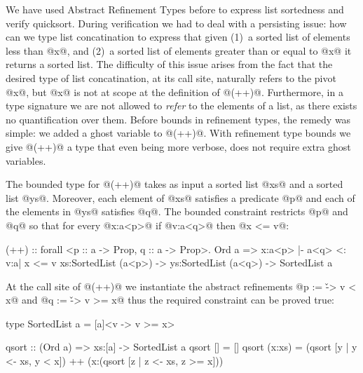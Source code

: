 We have used Abstract Refinement Types before to express list sortedness 
and verify quicksort. 
%
During verification we had to deal with a persisting issue:
how can we type list concatination to express that given 
(1)~a sorted list of elements less than @x@, and 
(2)~a sorted list of elements greater than or equal to @x@
it returns a sorted list. 
%
The difficulty of this issue arises from the fact that the desired type of 
list concatination, at its call site, naturally refers to the pivot @x@, 
but @x@ is not at scope at the definition of @(++)@.
%
Furthermore, in a type signature we are not allowed to \textit{refer} to 
the elements of a list, as there exists no quantification over them.
%
Before bounds in refinement types, the remedy was simple:
we added a ghost variable to @(++)@. 
%
With refinement type bounds we give @(++)@ a type that 
even being more verbose, does not require extra ghost variables. 
%

The bounded type for @(++)@ takes as input a sorted list @xs@ and a sorted list @ys@. 
%
Moreover, each element of @xs@ satisfies a predicate @p@ and 
each of the elements in @ys@ satisfies @q@.
%
The bounded constraint restricts @p@ and @q@ so that 
for every @x:a<p>@ if @v:a<q>@ then @x <= v@:
\begin{code}
 (++) :: forall <p :: a -> Prop, q :: a -> Prop>.
          Ord a => 
         {x:a<p> |- a<q> <: {v:a| x <= v}} 
         xs:SortedList (a<p>) -> ys:SortedList (a<q>) -> SortedList a
\end{code}

At the call site of @(++)@ we instantiate the abstract refinements @p := \v -> v < x@ 
and @q := \v -> v >= x@ thus the required constraint can be proved true:

\begin{code}
type SortedList a = [a]<{\x v -> v >= x}>

qsort :: (Ord a) => xs:[a] -> SortedList a
qsort []       = []
qsort (x:xs) = (qsort [y | y <- xs, y < x]) ++ (x:(qsort [z | z <- xs, z >= x])) 
\end{code}




